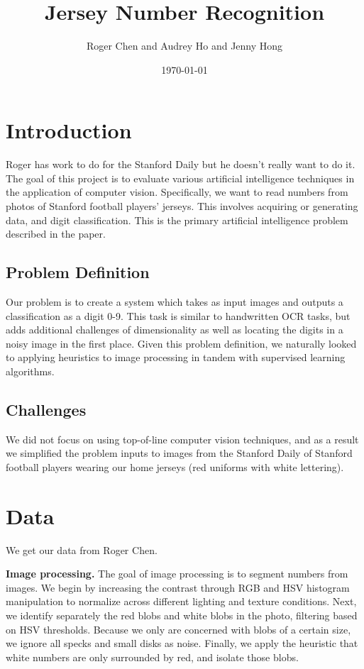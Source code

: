 \documentclass[a4paper]{article}
\title{Jersey Number Recognition}
\author{Roger Chen and Audrey Ho and Jenny Hong}
\date{\today}
\begin{document}
\maketitle

\section{Introduction}

Roger has work to do for the Stanford Daily but he doesn't really want to do it. \\

The goal of this project is to evaluate various artificial intelligence techniques in the application of computer vision. Specifically, we want to read numbers from photos of Stanford football players' jerseys. This involves acquiring or generating data, and digit classification. This is the primary artificial intelligence problem described in the paper.

\subsection{Problem Definition}

Our problem is to create a system which takes as input images and outputs a classification as a digit 0-9. This task is similar to handwritten OCR tasks, but adds additional challenges of dimensionality as well as locating the digits in a noisy image in the first place. Given this problem definition, we naturally looked to applying heuristics to image processing in tandem with supervised learning algorithms.

\subsection{Challenges}

We did not focus on using top-of-line computer vision techniques, and as a result we simplified the problem inputs to images from the Stanford Daily of Stanford football players wearing our home jerseys (red uniforms with white lettering). 

\section{Data}

We get our data from Roger Chen.

{\bf Image processing.} The goal of image processing is to segment numbers from images. We begin by increasing the contrast through RGB and HSV histogram manipulation to normalize across different lighting and texture conditions. Next, we identify separately the red blobs and white blobs in the photo, filtering based on HSV thresholds. Because we only are concerned with blobs of a certain size, we ignore all specks and small disks as noise. Finally, we apply the heuristic that white numbers are only surrounded by red, and isolate those blobs. \\
\end{document}
